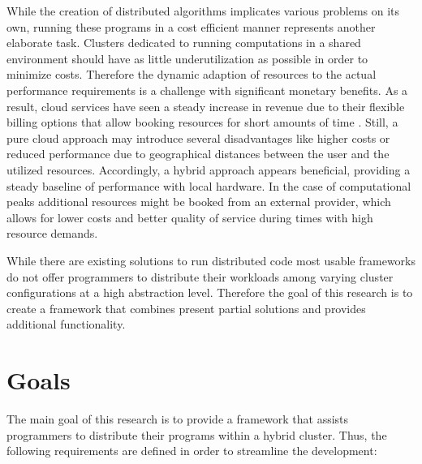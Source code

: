 While the creation of distributed algorithms implicates various problems on its own, running these programs in a cost efficient manner represents another elaborate task. Clusters dedicated to running computations in a shared environment should have as little underutilization as possible in order to minimize costs. Therefore the dynamic adaption of resources to the actual performance requirements is a challenge with significant monetary benefits. As a result, cloud services have seen a steady increase in revenue due to their flexible billing options that allow booking resources for short amounts of time \cite{gartner_2017}. Still, a pure cloud approach may introduce several disadvantages like higher costs or reduced performance due to geographical distances between the user and the utilized resources. Accordingly, a hybrid approach appears beneficial, providing a steady baseline of performance with local hardware. In the case of computational peaks additional resources might be booked from an external provider, which allows for lower costs and better quality of service during times with high resource demands.

While there are existing solutions to run distributed code most usable frameworks do not offer programmers to distribute their workloads among varying cluster configurations at a high abstraction level. Therefore the goal of this research is to create a framework that combines present partial solutions and provides additional functionality.

\section{Goals}
\label{goals}
The main goal of this research is to provide a framework that assists programmers to distribute their programs within a hybrid cluster. Thus, the following requirements are defined in order to streamline the development:

